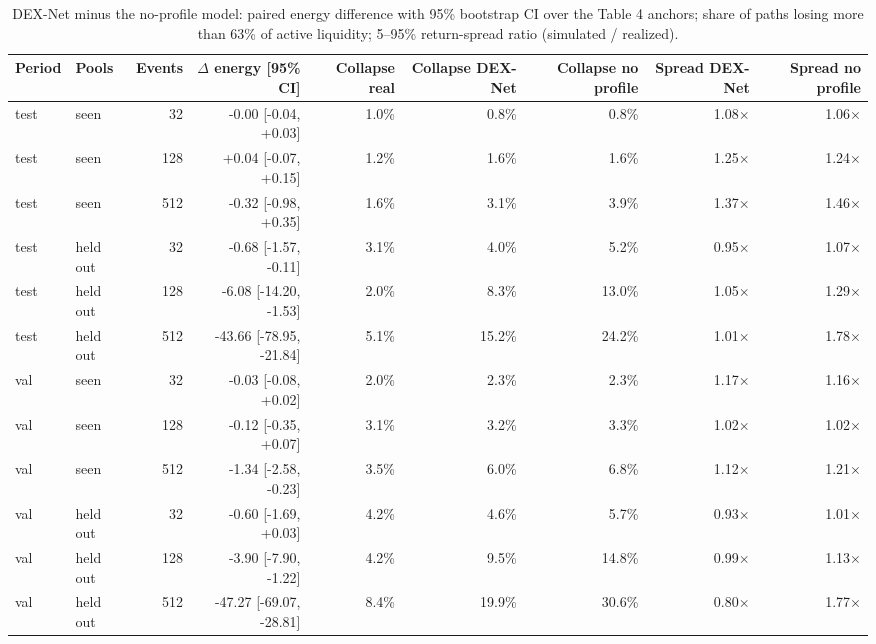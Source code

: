 \documentclass[11pt]{article}
\begin{document}
\begin{table}[t]
\centering
\caption{DEX-Net minus the no-profile model: paired energy difference with 95\% bootstrap CI over the Table 4 anchors; share of paths losing more than 63\% of active liquidity; 5--95\% return-spread ratio (simulated / realized).}\label{tab:5}
\begin{adjustbox}{max width=\linewidth}
\begin{tabular}{llrrrrrrr}
\toprule
Period & Pools & Events & $\Delta$ energy [95\% CI] & Collapse real & Collapse DEX-Net & Collapse no profile & Spread DEX-Net & Spread no profile \\
\midrule
test & seen & 32 & -0.00 [-0.04, +0.03] & 1.0\% & 0.8\% & 0.8\% & 1.08\ensuremath{\times} & 1.06\ensuremath{\times} \\
test & seen & 128 & +0.04 [-0.07, +0.15] & 1.2\% & 1.6\% & 1.6\% & 1.25\ensuremath{\times} & 1.24\ensuremath{\times} \\
test & seen & 512 & -0.32 [-0.98, +0.35] & 1.6\% & 3.1\% & 3.9\% & 1.37\ensuremath{\times} & 1.46\ensuremath{\times} \\
\midrule
test & held out & 32 & -0.68 [-1.57, -0.11] & 3.1\% & 4.0\% & 5.2\% & 0.95\ensuremath{\times} & 1.07\ensuremath{\times} \\
test & held out & 128 & -6.08 [-14.20, -1.53] & 2.0\% & 8.3\% & 13.0\% & 1.05\ensuremath{\times} & 1.29\ensuremath{\times} \\
test & held out & 512 & -43.66 [-78.95, -21.84] & 5.1\% & 15.2\% & 24.2\% & 1.01\ensuremath{\times} & 1.78\ensuremath{\times} \\
\midrule
val & seen & 32 & -0.03 [-0.08, +0.02] & 2.0\% & 2.3\% & 2.3\% & 1.17\ensuremath{\times} & 1.16\ensuremath{\times} \\
val & seen & 128 & -0.12 [-0.35, +0.07] & 3.1\% & 3.2\% & 3.3\% & 1.02\ensuremath{\times} & 1.02\ensuremath{\times} \\
val & seen & 512 & -1.34 [-2.58, -0.23] & 3.5\% & 6.0\% & 6.8\% & 1.12\ensuremath{\times} & 1.21\ensuremath{\times} \\
\midrule
val & held out & 32 & -0.60 [-1.69, +0.03] & 4.2\% & 4.6\% & 5.7\% & 0.93\ensuremath{\times} & 1.01\ensuremath{\times} \\
val & held out & 128 & -3.90 [-7.90, -1.22] & 4.2\% & 9.5\% & 14.8\% & 0.99\ensuremath{\times} & 1.13\ensuremath{\times} \\
val & held out & 512 & -47.27 [-69.07, -28.81] & 8.4\% & 19.9\% & 30.6\% & 0.80\ensuremath{\times} & 1.77\ensuremath{\times} \\
\bottomrule
\end{tabular}
\end{adjustbox}
\end{table}
\end{document}
